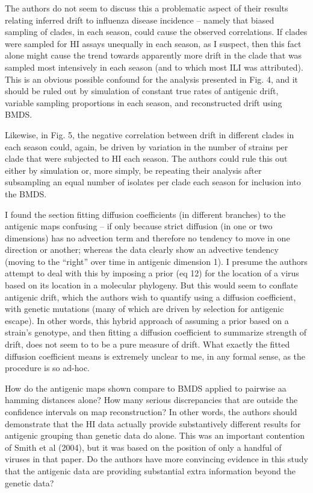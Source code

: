 \documentclass[11pt,oneside,letterpaper]{article}
\begin{document}
The authors do not seem to discuss this a problematic aspect of their results relating inferred drift to influenza disease incidence -- namely that biased sampling of clades, in each season, could cause the observed correlations. If clades were sampled for HI assays unequally in each season, as I suspect, then this fact alone might cause the trend towards apparently more drift in the clade that was sampled most intensively in each season (and to which most ILI was attributed). This is an obvious possible confound for the analysis presented in Fig. 4, and it should be ruled out by simulation of constant true rates of antigenic drift, variable sampling proportions in each season, and reconstructed drift using BMDS.

Likewise, in Fig. 5, the negative correlation between drift in different clades in each season could, again, be driven by variation in the number of strains per clade that were subjected to HI each season. The authors could rule this out either by simulation or, more simply, be repeating their analysis after subsampling an equal number of isolates per clade each season for inclusion into the BMDS.

I found the section fitting diffusion coefficients (in different branches) to the antigenic maps confusing -- if only because strict diffusion (in one or two dimensions) has no advection term and therefore no tendency to move in one direction or another; whereas the data clearly show an advective tendency (moving to the ``right'' over time in antigenic dimension 1). I presume the authors attempt to deal with this by imposing a prior (eq 12) for the location of a virus based on its location in a molecular phylogeny. But this would seem to conflate antigenic drift, which the authors wish to quantify using a diffusion coefficient, with genetic mutations (many of which are driven by selection for antigenic escape). In other words, this hybrid approach of assuming a prior based on a strain's genotype, and then fitting a diffusion coefficient to summarize strength of drift, does not seem to to be a pure measure of drift. What exactly the fitted diffusion coefficient means is extremely unclear to me, in any formal sense, as the procedure is so ad-hoc.

How do the antigenic maps shown compare to BMDS applied to pairwise aa hamming distances alone? How many serious discrepancies that are outside the confidence intervals on map reconstruction? In other words, the authors should demonstrate that the HI data actually provide substantively different results for antigenic grouping than genetic data do alone. This was an important contention of Smith et al (2004), but it was based on the position of only a handful of viruses in that paper. Do the authors have more convincing evidence in this study that the antigenic data are providing substantial extra information beyond the genetic data?
\end{document}

